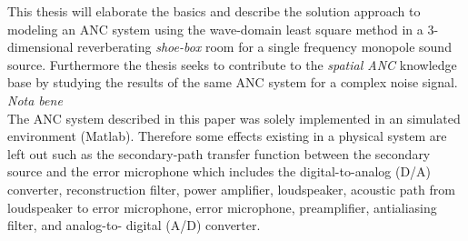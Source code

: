 This thesis will elaborate the basics and describe the solution approach to modeling an ANC system using the wave-domain least square method in a 3-dimensional reverberating \textit{shoe-box} room for a single frequency monopole sound source. Furthermore the thesis seeks to contribute to the \textit{spatial ANC} knowledge base by studying the results of the same ANC system for a complex noise signal.\\


\textit{Nota bene}\\
The ANC system described in this paper was solely implemented in an simulated environment (Matlab). Therefore some effects existing in a physical system are left out such as the secondary-path transfer function between the secondary source and the error microphone which includes the digital-to-analog (D/A) converter, reconstruction filter, power amplifier, loudspeaker, acoustic path from loudspeaker to error microphone, error microphone, preamplifier, antialiasing filter, and analog-to- digital (A/D) converter.\cite{Kuo1999}


